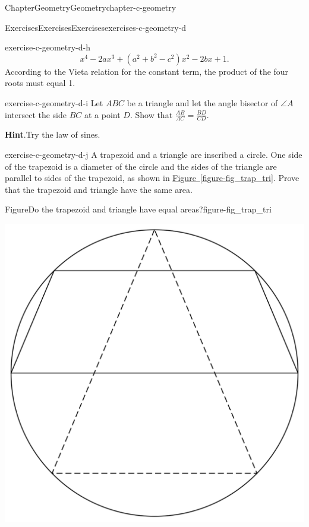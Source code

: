\documentclass[oneside,10pt,]{book}
\newcommand{\blocktitlefont}{\relax}
\newcommand{\xreffont}{\relax}
\numberwithin{equation}{section}
\begin{document}
\begin{chapterptx}{Chapter}{Geometry}{}{Geometry}{}{}{chapter-c-geometry}
\begin{exercises-section}{Exercises}{Exercises}{}{Exercises}{}{}{exercises-c-geometry-d}
\begin{divisionexercise}{7}{}{}{exercise-c-geometry-d-h}
\begin{equation*}
x^4-2 a x^3 + (a^2+b^2-c^2)x^2 -2b x +1.
\end{equation*}
According to the Vieta relation for the constant term, the product of the four roots must equal 1.%
\end{divisionexercise}%
\begin{divisionexercise}{8}{}{}{exercise-c-geometry-d-i}%
Let \(ABC\) be a triangle and let the angle bisector of \(\angle A\) intersect the side \(BC\) at a point \(D\). Show that \(\frac{A B}{A C} = \frac{B D}{C D}\).%
\par\smallskip%
\noindent\textbf{\blocktitlefont Hint}.\hypertarget{hint-c-geometry-d-i-b}{}\quad{}Try the law of sines.%
\end{divisionexercise}%
\begin{divisionexercise}{9}{}{}{exercise-c-geometry-d-j}%
A trapezoid and a triangle are inscribed a circle. One side of the trapezoid is a diameter of the circle and the sides of the  triangle are parallel to sides of the trapezoid, as shown in \hyperref[figure-fig_trap_tri]{Figure~{\xreffont\ref{figure-fig_trap_tri}}}. Prove that the trapezoid and triangle have the same area.%
\begin{figureptx}{Figure}{Do the trapezoid and triangle have equal areas?}{figure-fig_trap_tri}{}%
\begin{image}{0.2}{0.6}{0.2}%
\includegraphics[width=\linewidth]{images/fig_trap_tri.png}

\end{image}
\end{figureptx}
\end{divisionexercise}
\end{exercises-section}
\end{chapterptx}
\end{document}
